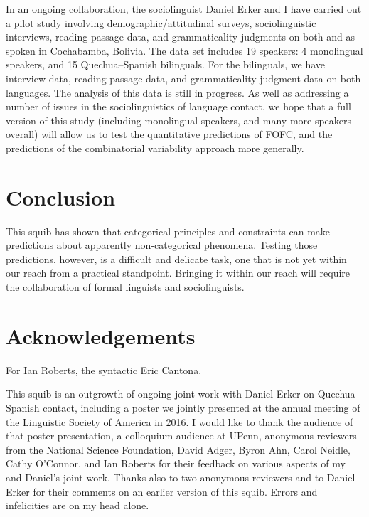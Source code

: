 \documentclass[output=paper]{langsci/langscibook}
\begin{document}
In an ongoing collaboration, the sociolinguist Daniel Erker
and I have carried out a pilot study involving demographic/attitudinal surveys,
sociolinguistic interviews, reading passage data, and grammaticality judgments
on both  and  as spoken in Cochabamba, Bolivia.  The data set
includes 19 speakers: 4 monolingual  speakers, and 15 Quechua--Spanish
bilinguals.  For the bilinguals, we have interview data, reading passage data,
and grammaticality judgment data on both languages.     The analysis of this
data is still in progress.  As well as addressing a number of issues in the
sociolinguistics of language contact, we hope that a full version of this study
(including monolingual  speakers, and many more speakers overall) will
allow us to test the quantitative predictions of FOFC, and the predictions of
the combinatorial variability approach more generally.

\section{Conclusion}\label{sec-30:key:4}

This squib has shown that categorical principles and constraints can make
predictions about apparently non-categorical phenomena.  Testing those
predictions, however, is a difficult and delicate task, one that is not yet
within our reach from a practical standpoint.  Bringing it within our reach
will require the collaboration of formal linguists and sociolinguists.

\printchapterglossary{}

\section*{Acknowledgements}

For Ian Roberts, the syntactic Eric Cantona.

This squib is an outgrowth of ongoing joint work with Daniel Erker on
Que\-chua--Spanish contact, including a poster we jointly presented at the annual
meeting of the Linguistic Society of America in 2016. I would like to thank the
audience of that poster presentation, a colloquium audience at UPenn, anonymous
reviewers from the National Science Foundation, David Adger, Byron Ahn, Carol
Neidle, Cathy O’Connor, and Ian Roberts for their feedback on various aspects
of my and Daniel’s joint work. Thanks also to two anonymous reviewers and to
Daniel Erker for their comments on an earlier version of this squib. Errors and
infelicities are on my head alone.

{\sloppy\printbibliography[heading=subbibliography,notkeyword=this]}
\end{document}
